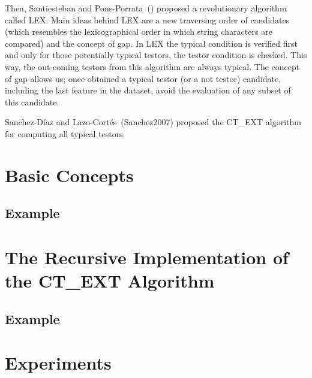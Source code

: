 \documentclass[citeauthoryear]{llncs}
\begin{document}
	Then, Santiesteban and Pons-Porrata~(\cite{Santiesteban2003}) proposed a revolutionary algorithm
	called LEX. Main ideas behind LEX are a new traversing order of candidates (which resembles the
	lexicographical order in which string characters are compared) and the concept of gap. In LEX
	the typical condition is verified first and only for those potentially typical testors, the testor 
	condition is checked. This way, the out-coming testors from this algorithm are always typical.
	The concept of gap allows us; once obtained a typical testor (or a not testor) candidate, including 
	the last feature in the dataset, avoid the evaluation of any subset of this candidate.
	
	Sanchez-D\'iaz and Lazo-Cort\'es~(Sanchez2007) proposed the CT\_EXT algorithm for computing all
	typical testors.
	
%
\section{Basic Concepts}
%
\subsection{Example}
%
\section{The Recursive Implementation of the CT\_EXT Algorithm}
%
\subsection{Example}
%
\section{Experiments}
%
%
\end{document}
